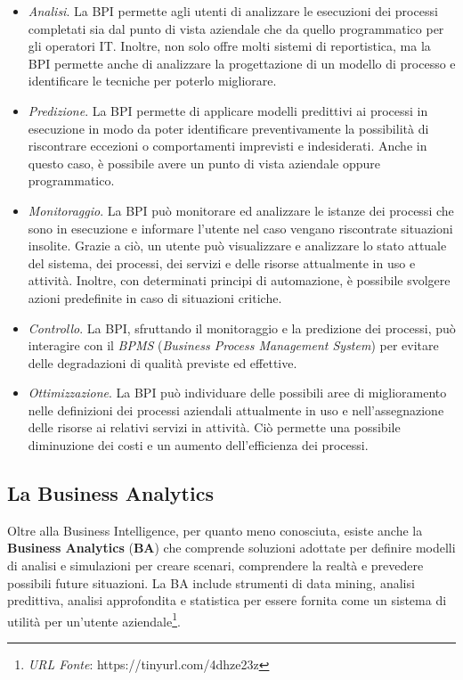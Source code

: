 \begin{itemize}
    \item \textit{Analisi}. La BPI permette agli utenti di analizzare le esecuzioni dei processi completati sia dal punto di vista aziendale che da quello programmatico per gli operatori IT. Inoltre, non solo offre molti sistemi di reportistica, ma la BPI permette anche di analizzare la progettazione di un modello di processo e identificare le tecniche per poterlo migliorare.
    \item \textit{Predizione}. La BPI permette di applicare modelli predittivi ai processi in esecuzione in modo da poter identificare preventivamente la possibilità di riscontrare eccezioni o comportamenti imprevisti e indesiderati. Anche in questo caso, è possibile avere un punto di vista aziendale oppure programmatico.
    \item \textit{Monitoraggio}. La BPI può monitorare ed analizzare le istanze dei processi che sono in esecuzione e informare l'utente nel caso vengano riscontrate situazioni insolite. Grazie a ciò, un utente può visualizzare e analizzare lo stato attuale del sistema, dei processi, dei servizi e delle risorse attualmente in uso e attività. Inoltre, con determinati principi di automazione, è possibile svolgere azioni predefinite in caso di situazioni critiche.
    \item \textit{Controllo}. La BPI, sfruttando il monitoraggio e la predizione dei processi, può interagire con il \textit{BPMS} (\textit{Business Process Management System}) per evitare delle degradazioni di qualità previste ed effettive.
    \item \textit{Ottimizzazione}. La BPI può individuare delle possibili aree di miglioramento nelle definizioni dei processi aziendali attualmente in uso e nell'assegnazione delle risorse ai relativi servizi in attività. Ciò permette una possibile diminuzione dei costi e un aumento dell'efficienza dei processi.
\end{itemize}

\subsection{La Business Analytics}

Oltre alla Business Intelligence, per quanto meno conosciuta, esiste anche la \textbf{Business Analytics} (\textbf{BA}) che comprende soluzioni adottate per definire modelli di analisi e simulazioni per creare scenari, comprendere la realtà e prevedere possibili future situazioni. La BA include strumenti di data mining, analisi predittiva, analisi approfondita e statistica per essere fornita come un sistema di utilità per un'utente aziendale\footnote{\textit{URL Fonte}: https://tinyurl.com/4dhze23z}.

